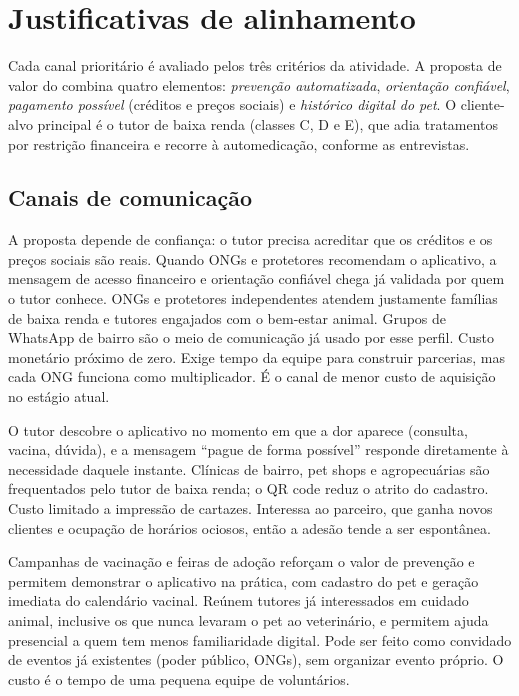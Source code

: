 \section{Justificativas de alinhamento}
\label{sec:justificativa}

Cada canal prioritário é avaliado pelos três critérios da atividade. A proposta de valor do
\projeto{} combina quatro elementos: \emph{prevenção automatizada}, \emph{orientação
confiável}, \emph{pagamento possível} (créditos e preços sociais) e \emph{histórico digital do
pet}. O cliente-alvo principal é o tutor de baixa renda (classes C, D e E), que adia
tratamentos por restrição financeira e recorre à automedicação, conforme as entrevistas.

\subsection{Canais de comunicação}

{A proposta depende de confiança: o tutor precisa acreditar que os créditos e os preços
sociais são reais. Quando ONGs e protetores recomendam o aplicativo, a mensagem de acesso
financeiro e orientação confiável chega já validada por quem o tutor conhece.}
{ONGs e protetores independentes atendem justamente famílias de baixa renda e tutores
engajados com o bem-estar animal. Grupos de WhatsApp de bairro são o meio de comunicação já
usado por esse perfil.}
{Custo monetário próximo de zero. Exige tempo da equipe para construir parcerias, mas cada ONG
funciona como multiplicador. É o canal de menor custo de aquisição no estágio atual.}

{O tutor descobre o aplicativo no momento em que a dor aparece (consulta, vacina, dúvida), e a
mensagem ``pague de forma possível'' responde diretamente à necessidade daquele instante.}
{Clínicas de bairro, pet shops e agropecuárias são frequentados pelo tutor de baixa renda; o
QR code reduz o atrito do cadastro.}
{Custo limitado a impressão de cartazes. Interessa ao parceiro, que ganha novos clientes e
ocupação de horários ociosos, então a adesão tende a ser espontânea.}

{Campanhas de vacinação e feiras de adoção reforçam o valor de prevenção e permitem
demonstrar o aplicativo na prática, com cadastro do pet e geração imediata do calendário
vacinal.}
{Reúnem tutores já interessados em cuidado animal, inclusive os que nunca levaram o pet ao
veterinário, e permitem ajuda presencial a quem tem menos familiaridade digital.}
{Pode ser feito como convidado de eventos já existentes (poder público, ONGs), sem organizar
evento próprio. O custo é o tempo de uma pequena equipe de voluntários.}

